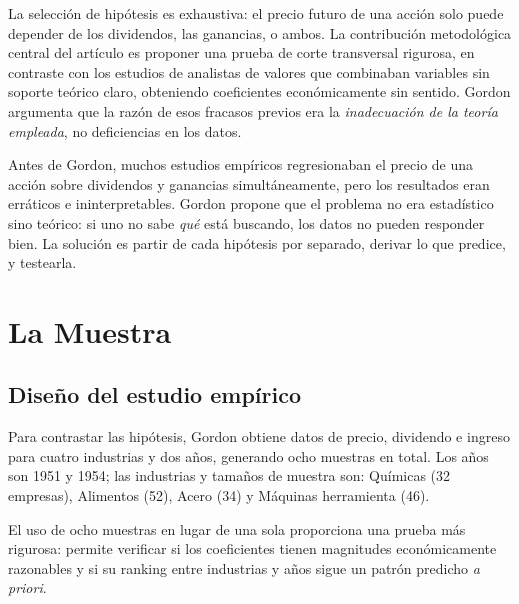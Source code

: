 \documentclass[12pt]{article}
\begin{document}
\begin{explicacion}
La selecci\'on de hip\'otesis es exhaustiva: el precio futuro de una acci\'on solo puede depender de los dividendos, las ganancias, o ambos. La contribuci\'on metodol\'ogica central del art\'iculo es proponer una prueba de corte transversal rigurosa, en contraste con los estudios de analistas de valores que combinaban variables sin soporte te\'orico claro, obteniendo coeficientes econ\'omicamente sin sentido. Gordon argumenta que la raz\'on de esos fracasos previos era la \textit{inadecuaci\'on de la teor\'ia empleada}, no deficiencias en los datos.
\end{explicacion}

\begin{intuicion}
Antes de Gordon, muchos estudios empíricos regresionaban el precio de una acci\'on sobre dividendos y ganancias simult\'aneamente, pero los resultados eran erráticos e ininterpretables. Gordon propone que el problema no era estadístico sino te\'orico: si uno no sabe \textit{qu\'e} est\'a buscando, los datos no pueden responder bien. La soluci\'on es partir de cada hip\'otesis por separado, derivar lo que predice, y testearla.
\end{intuicion}

\section{La Muestra}

\subsection{Dise\~no del estudio emp\'irico}

Para contrastar las hip\'otesis, Gordon obtiene datos de precio, dividendo e ingreso para cuatro industrias y dos a\~nos, generando ocho muestras en total. Los a\~nos son 1951 y 1954; las industrias y tama\~nos de muestra son: Qu\'imicas (32 empresas), Alimentos (52), Acero (34) y M\'aquinas herramienta (46).

El uso de ocho muestras en lugar de una sola proporciona una prueba m\'as rigurosa: permite verificar si los coeficientes tienen magnitudes econ\'omicamente razonables y si su ranking entre industrias y a\~nos sigue un patr\'on predicho \textit{a priori}.
\end{document}
